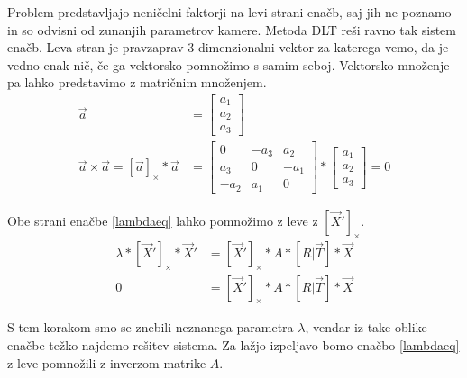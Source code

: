 \documentclass[a4paper, 12pt]{book}
\begin{document}
Problem predstavljajo neničelni faktorji na levi strani enačb, saj jih ne poznamo in so odvisni od zunanjih parametrov kamere. Metoda DLT reši ravno tak sistem enačb. Leva stran je pravzaprav 3-dimenzionalni vektor za katerega vemo, da je vedno enak nič, če ga vektorsko pomnožimo s samim seboj. Vektorsko množenje pa lahko predstavimo z matričnim množenjem.
\begin{align}
\vec{a} &= 
\begin{bmatrix}
a_1 \\
a_2 \\
a_3
\end{bmatrix} \\
\vec{a} \times \vec{a} = [\vec{a}]_{\times} * \vec{a} &= 
\begin{bmatrix}
0 & -a_3 & a_2 \\
a_3 & 0 & -a_1 \\
-a_2 & a_1 & 0
\end{bmatrix}
* \begin{bmatrix}
a_1 \\
a_2 \\
a_3
\end{bmatrix} = 0
\end{align}

Obe strani enačbe \eqref{lambdaeq} lahko pomnožimo z leve z $[\vec{X}']_{\times}$.
\begin{align}
\lambda * [\vec{X}']_{\times} * \vec{X}' &= [\vec{X}']_{\times} * A * [R | \vec{T}] * \vec{X} \\
0 &= [\vec{X}']_{\times} * A * [R | \vec{T}] * \vec{X}
\end{align}

S tem korakom smo se znebili neznanega parametra $\lambda$, vendar iz take oblike enačbe težko najdemo rešitev sistema. Za lažjo izpeljavo bomo enačbo \eqref{lambdaeq} z leve pomnožili z inverzom matrike $A$.
\end{document}
